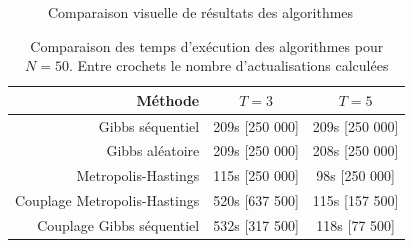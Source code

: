 \documentclass[a4paper,11pt]{article}
\begin{document}
\begin{figure}[!htbp]
	\centering
	\caption{Comparaison visuelle de résultats des algorithmes}
	\label{fig:compar_vis}
\end{figure}
\begin{table}[!htbp]
	\centering
	\begin{tabular}{r|||c||c|}
		Méthode & $T = 3$ & $T = 5$ \\
		\hline \hline
		Gibbs séquentiel & 209s [250 000] & 209s [250 000] \\
		\hline
		Gibbs aléatoire & 209s [250 000] & 208s [250 000] \\
		\hline
		Metropolis-Hastings & 115s [250 000] & 98s [250 000] \\
		\hline
		Couplage Metropolis-Hastings & 520s [637 500] & 115s [157 500] \\
		\hline
		Couplage Gibbs séquentiel & 532s [317 500] & 118s [77 500]
	\end{tabular}
	\caption{Comparaison des temps d'exécution des algorithmes pour $N = 50$. Entre crochets le nombre d'actualisations calculées}
	\label{tab:compar_tps}
\end{table}
\end{document}
